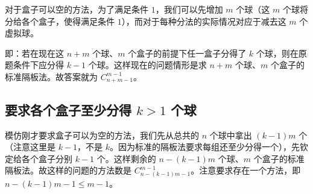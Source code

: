 
对于盒子可以空的方法，为了满足条件 $1$，我们可以先增加 $m$ 个球（这 $m$ 个球将分给各个盒子，使得满足条件 $1$），而对于每种分法的实际情况对应于减去这 $m$ 个虚拟球。

即：若在现在这 $n+m$ 个球、$m$ 个盒子的前提下任一盒子分得了 $k$ 个球，则在原题条件下应分得 $k-1$ 个球。这样现在的问题情形是求 $n+m$ 个球、$m$ 个盒子的标准隔板法。故答案就为 $C_{n+m-1}^{m-1}$。

\subsection{要求各个盒子至少分得 $k > 1$ 个球}
模仿刚才要求盒子可以为空的方法，我们先从总共的 $n$ 个球中拿出 $(k-1)m$ 个（注意这里是 $k-1$，不是 $k$。因为标准的隔板法要求每组还至少分得一个），先钦定给各个盒子分别 $k-1$ 个。这样剩余的 $n-(k-1)m$ 个球、$m$ 个盒子的标准隔板法。故这样的问题的方法数是 $C_{n-(k-1)m-1}^{m-1}$。注意要求存在一个方法，即 $n-(k-1)m-1 \le m-1$。
